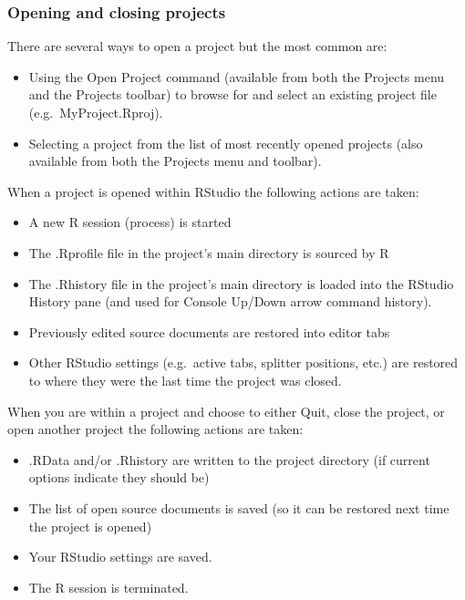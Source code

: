 \documentclass[
]{book}
\providecommand{\tightlist}{%
  \setlength{\itemsep}{0pt}\setlength{\parskip}{0pt}}
\begin{document}
\hypertarget{openproj}{%
\subsubsection{Opening and closing projects}\label{openproj}}

There are several ways to open a project but the most common are:

\begin{itemize}
\tightlist
\item
  Using the Open Project command (available from both the Projects menu and the Projects toolbar) to browse for and select an existing project file (e.g.~MyProject.Rproj).
\item
  Selecting a project from the list of most recently opened projects (also available from both the Projects menu and toolbar).
\end{itemize}

When a project is opened within RStudio the following actions are taken:

\begin{itemize}
\tightlist
\item
  A new R session (process) is started
\item
  The .Rprofile file in the project's main directory is sourced by R
\item
  The .Rhistory file in the project's main directory is loaded into the RStudio History pane (and used for Console Up/Down arrow command history).
\item
  Previously edited source documents are restored into editor tabs
\item
  Other RStudio settings (e.g.~active tabs, splitter positions, etc.) are restored to where they were the last time the project was closed.
\end{itemize}

When you are within a project and choose to either Quit, close the project, or open another project the following actions are taken:

\begin{itemize}
\tightlist
\item
  .RData and/or .Rhistory are written to the project directory (if current options indicate they should be)
\item
  The list of open source documents is saved (so it can be restored next time the project is opened)
\item
  Your RStudio settings are saved.
\item
  The R session is terminated.
\end{itemize}
\end{document}
